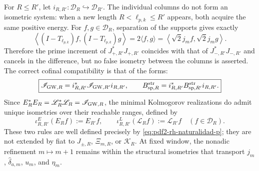 For \(R\leq R'\), let
\(i_{R,R'}:\mathcal D_R\hookrightarrow\mathcal D_{R'}\). The individual
columns do not form an isometric system: when a new length
\(R<\ell_{p,k}\leq R'\) appears, both acquire the same positive energy. For
\(f,g\in\mathcal D_R\), separation of the supports gives exactly
\begin{equation}\label{eq:pdf2-rh-naturalidad}
 \left\langle(I-T_{\ell_{p,k}})f,
                    (I-T_{\ell_{p,k}})g\right\rangle
 =2\langle f,g\rangle
 =\left\langle\sqrt2j_mf,\sqrt2j_mg\right\rangle .
\end{equation}
Therefore the prime increment of
\(J_{+,R'}^*J_{+,R'}\) coincides with that of
\(J_{-,R'}^*J_{-,R'}\) and cancels in the difference, but no false
isometry between the columns is asserted. The correct cofinal compatibility is that
of the forms:
\begin{equation}\label{eq:pdf2-rh-naturalidad-p}
 \boxed{
 \mathscr I_{{\rm GW},R}
 =i_{R,R'}^*\mathscr I_{{\rm GW},R'}i_{R,R'},
 \qquad
 \mathcal B_{{\rm sp},R}^{\rm str}
 =i_{R,R'}^*\mathcal B_{{\rm sp},R'}^{\rm str}i_{R,R'}.}
\end{equation}
Since \(E_R^*E_R=\mathscr L_R^*\mathscr L_R=\mathscr I_{{\rm GW},R}\), the
minimal Kolmogorov realizations do admit unique isometries over their
reachable ranges, defined by
\begin{equation}\label{eq:pdf2-rh-naturalidad-bw}
 \iota_{R,R'}^E(E_Rf):=E_{R'}f,
 \qquad
 \iota_{R,R'}^L(\mathscr L_Rf):=\mathscr L_{R'}f
 \quad(f\in\mathcal D_R).
\end{equation}
These two rules are well defined precisely by
\eqref{eq:pdf2-rh-naturalidad-p}; they are not extended by fiat to
\(J_{\pm,R}\), \(\Xi_{m,R}\), or \(\mathcal K_R\). At fixed window, the nonadic refinement
\(m\mapsto m+1\) remains within the structural isometries
that transport \(j_m\), \(\widehat\delta_{a,m}\), \(u_m\), and \(\eta_m\).

